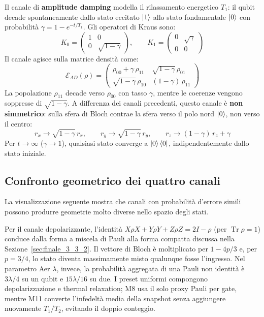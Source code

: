 Il canale di \textbf{amplitude damping} modella il rilassamento energetico $T_1$: il qubit decade spontaneamente dallo stato eccitato $\ket{1}$ allo stato fondamentale $\ket{0}$ con probabilità $\gamma = 1-e^{-t/T_1}$. Gli operatori di Kraus sono:
\begin{equation}
    K_0 = \begin{pmatrix}1 & 0 \\ 0 & \sqrt{1-\gamma}\end{pmatrix}, \qquad
    K_1 = \begin{pmatrix}0 & \sqrt{\gamma} \\ 0 & 0\end{pmatrix}
    \label{eq:kraus_ad}
\end{equation}
Il canale agisce sulla matrice densità come:
\begin{equation}
    \mathcal{E}_{AD}\!(\rho) = \begin{pmatrix}
        \rho_{00} + \gamma\,\rho_{11} & \sqrt{1-\gamma}\,\rho_{01} \\
        \sqrt{1-\gamma}\,\rho_{10}   & (1-\gamma)\,\rho_{11}
    \end{pmatrix}
    \label{eq:amp_damping_explicit}
\end{equation}
La popolazione $\rho_{11}$ decade verso $\rho_{00}$ con tasso $\gamma$, mentre le coerenze vengono soppresse di $\sqrt{1-\gamma}$. A differenza dei canali precedenti, questo canale è \textbf{non simmetrico}: sulla sfera di Bloch contrae la sfera verso il polo nord $\ket{0}$, non verso il centro:
\begin{equation}
    r_x \to \sqrt{1-\gamma}\,r_x, \qquad r_y \to \sqrt{1-\gamma}\,r_y, \qquad r_z \to (1-\gamma)\,r_z + \gamma
\end{equation}
Per $t \to \infty$ ($\gamma \to 1$), qualsiasi stato converge a $\ket{0}\bra{0}$, indipendentemente dallo stato iniziale.

\subsection{Confronto geometrico dei quattro canali}

La visualizzazione seguente mostra che canali con probabilità d'errore simili
possono produrre geometrie molto diverse nello spazio degli stati.

Per il canale depolarizzante, l'identità
$X\rho X+Y\rho Y+Z\rho Z=2I-\rho$ (per $\operatorname{Tr}\rho=1$) conduce
dalla forma a miscela di Pauli alla forma compatta discussa nella
Sezione~\ref{sec:finale_3_3_2}. Il vettore di Bloch è moltiplicato per
$1-4p/3$ e, per $p=3/4$, lo stato diventa massimamente misto qualunque fosse
l'ingresso. Nel parametro Aer $\lambda$, invece, la probabilità aggregata di
una Pauli non identità è $3\lambda/4$ su un qubit e $15\lambda/16$ su due.
I preset uniformi compongono depolarizzazione e thermal relaxation; M8 usa il
solo proxy Pauli per gate, mentre M11 converte l'infedeltà media della snapshot
senza aggiungere nuovamente $T_1/T_2$, evitando il doppio conteggio.

